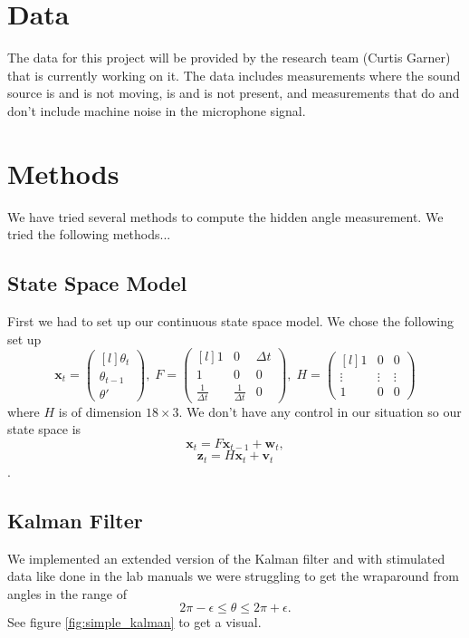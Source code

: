 \documentclass[11pt]{amsart}
\begin{document}
\section{Data}
The data for this project will be provided by the research team (Curtis Garner) that is currently working on it. The data includes measurements where the sound 
source is and is not moving, is and is not present, and measurements that do and don’t include machine noise in the microphone signal.




\section{Methods}
We have tried several methods to compute the hidden angle measurement. We tried the following methods...

\subsection{State Space Model}
First we had to set up our continuous state space model. We chose the following set up
\[\mathbf{x}_t = \begin{pmatrix*}[l]
    \theta_t \\
    \theta_{t-1} \\
    \theta'
\end{pmatrix*},\;  
F = \begin{pmatrix*}[l]
    1 & 0 & \Delta t \\
    1 & 0 & 0 \\
    \frac{1}{\Delta t} & \frac{1}{\Delta t} & 0
\end{pmatrix*},\;
H = \begin{pmatrix*}[l]
    1 & 0 & 0 \\
    \vdots & \vdots & \vdots\\
    1 & 0 & 0

\end{pmatrix*}\]
 where $H$ is of dimension $18\times3$. We don't have any control in our situation so our state space is
 \[\mathbf{x}_t = F\mathbf{x}_{t-1} + \mathbf{w}_t,\]
\[\mathbf{z}_t = H\mathbf{x}_t + \mathbf{v}_t\].

\subsection{Kalman Filter}
We implemented an extended version of the Kalman filter \cite{V3} and with stimulated data like done in the lab manuals we were struggling 
to get the wraparound from angles in the range of \[2\pi - \epsilon \leq \theta \leq 2\pi + \epsilon.\] See figure \ref{fig:simple_kalman}
to get a visual.
\end{document}
